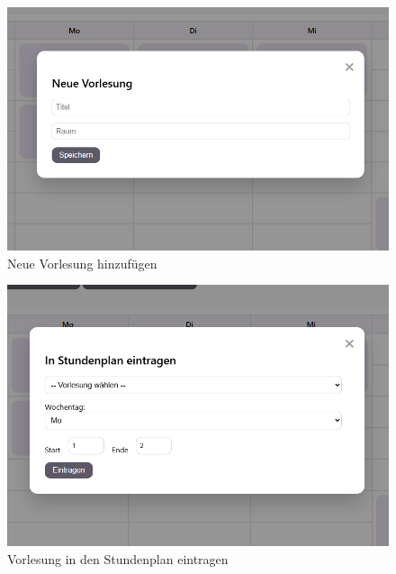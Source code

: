 \begin{figure}[H]
  \centering
  \includegraphics[width=1\textwidth]{./images/stundenplan-neuevorlesung.png}
  \caption{Neue Vorlesung hinzufügen}
  \label{fig:neue-vorlesungen}
\end{figure}

\begin{figure}[H]
  \centering
  \includegraphics[width=1\textwidth]{./images/stundenplan-instundenplan.png}
  \caption{Vorlesung in den Stundenplan eintragen}
  \label{fig:stundenplan-vorlesung}
\end{figure}

